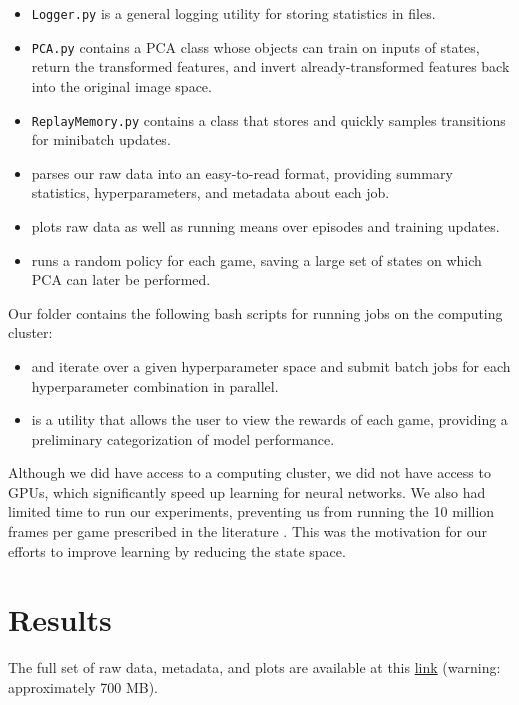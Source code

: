 \documentclass[11pt]{article}
\begin{document}
\begin{itemize}
    \item \texttt{Logger.py} is a general logging utility for storing statistics in files. 
    \item \texttt{PCA.py} contains a PCA class whose objects can train on inputs of states, return the transformed features, and invert already-transformed features back into the original image space. 
    \item \texttt{ReplayMemory.py} contains a class that stores and quickly samples transitions for minibatch updates. 
    \item {} parses our raw data into an easy-to-read format, providing summary statistics, hyperparameters, and metadata about each job. 
    \item {} plots raw data as well as running means over episodes and training updates. 
    \item {} runs a random policy for each game, saving a large set of states on which PCA can later be performed. 
\end{itemize}
 
Our  folder contains the following bash scripts for running jobs on the computing cluster:

\begin{itemize}
    \item {} and  iterate over a given hyperparameter space and submit batch jobs for each hyperparameter combination in parallel.
    \item {} is a utility that allows the user to view the rewards of each game, providing a preliminary categorization of model performance. 
\end{itemize}

Although we did have access to a computing cluster, we did not have access to GPUs, which significantly speed up learning for neural networks. We also had limited time to run our experiments, preventing us from running the 10 million frames per game prescribed in the literature \cite{mnih2013playing, mnih2015human}. This was the motivation for our efforts to improve learning by reducing the state space.

\section{Results}

The full set of raw data, metadata, and plots are available at this \href{https://drive.google.com/drive/folders/15gt9bv0kPBCHnJyW_RzsYQygeMaK1uCf?usp=sharing}{link} (warning: approximately 700 MB).
\end{document}
